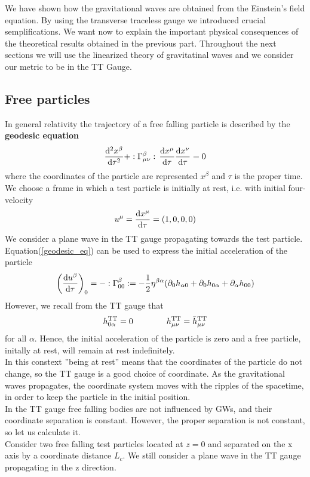 We have shown how the gravitational waves are obtained from the Einstein's field equation. 
By using the transverse traceless gauge we introduced crucial semplifications. 
We want now to explain the important physical consequences of the theoretical results obtained in the previous part.
Throughout the next sections we will use the linearized theory of gravitatinal waves and we consider our metric to be in the TT Gauge.
\subsection{Free particles}
In general relativity the trajectory of a free falling particle is described by the \textbf{geodesic equation}
\begin{equation}
\label{geodesic_eq}
\dv[2]{x^{\beta}}{\tau} + :\Gamma^{\beta} _{\mu \nu}: \,\dv{x^{\mu}}{\tau} \dv{x^{\nu}}{\tau} = 0
\end{equation}
where the coordinates of the particle are represented $x^{\beta}$ and $\tau$ is the proper time.\\
We choose a frame in which a test particle is initially at rest, i.e. with initial four-velocity
\[
u^{\mu} = \dv{x^{\mu}}{\tau} = (1,0,0,0)
\]
We consider a plane wave in the TT gauge propagating towards the test particle. \\
Equation(\ref{geodesic_eq}) can be used to express the initial acceleration of the particle
\[
\qty(
\dv{u^{\beta}}{\tau} 
)_{0}
=
- :\Gamma^{\beta} _{0 0}: 
= -\dfrac{1}{2} \eta ^{\beta \alpha}
\qty(
\partial_{0} h_{\alpha 0} + 
\partial_{0} h_{0 \alpha} + 
\partial_{\alpha} h_{0 0}
)
\]
However, we recall from the TT gauge that
\[
h^{\text{TT}}_{0 \alpha} = 0 \qquad  \qquad h^{\text{TT}}_{\mu \nu} = \bar{h}^{\text{TT}}_{\mu \nu} 
\]
for all $\alpha$. Hence, the initial acceleration of the particle is zero and a free particle, initally at rest, will remain at rest indefinitely.\\
In this constext ''being at rest'' means that the coordinates of the particle do not change, so the TT gauge is a good choice of coordinate. As the gravitational waves propagates, the coordinate system moves with the ripples of the spacetime, in order to keep the particle in the initial position. \\
In the TT gauge free falling bodies are not influenced by  GWs, and their coordinate separation is constant. However, the proper separation is not constant, so let us calculate it.\\
Consider two free falling test particles located at $z=0$ and separated on the x axis by a coordinate distance $L_c$. We still consider a plane wave in the TT gauge propagating in the z direction.\\
